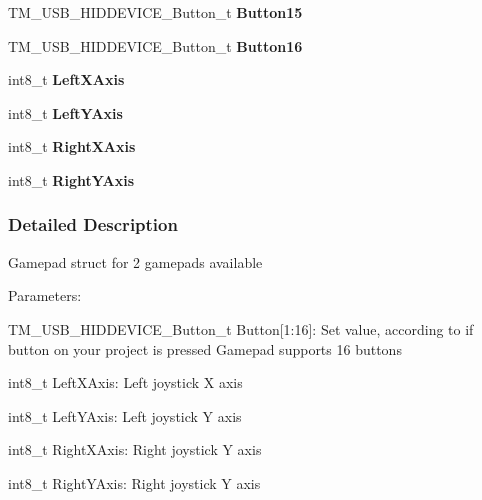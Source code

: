 \begin{DoxyCompactItemize}
\item 
\hypertarget{struct_t_m___u_s_b___h_i_d_d_e_v_i_c_e___gamepad__t_a56b1e8532360426db2b295eb3fdbef41}{}T\+M\+\_\+\+U\+S\+B\+\_\+\+H\+I\+D\+D\+E\+V\+I\+C\+E\+\_\+\+Button\+\_\+t {\bfseries Button15}\label{struct_t_m___u_s_b___h_i_d_d_e_v_i_c_e___gamepad__t_a56b1e8532360426db2b295eb3fdbef41}

\item 
\hypertarget{struct_t_m___u_s_b___h_i_d_d_e_v_i_c_e___gamepad__t_a0280244d78d303ee9c15531118e0e3fe}{}T\+M\+\_\+\+U\+S\+B\+\_\+\+H\+I\+D\+D\+E\+V\+I\+C\+E\+\_\+\+Button\+\_\+t {\bfseries Button16}\label{struct_t_m___u_s_b___h_i_d_d_e_v_i_c_e___gamepad__t_a0280244d78d303ee9c15531118e0e3fe}

\item 
\hypertarget{struct_t_m___u_s_b___h_i_d_d_e_v_i_c_e___gamepad__t_a5056ef0eb78331dcbe32b07d5f98edfd}{}int8\+\_\+t {\bfseries Left\+X\+Axis}\label{struct_t_m___u_s_b___h_i_d_d_e_v_i_c_e___gamepad__t_a5056ef0eb78331dcbe32b07d5f98edfd}

\item 
\hypertarget{struct_t_m___u_s_b___h_i_d_d_e_v_i_c_e___gamepad__t_ad21d8cc1f96897a06d62130fe3769700}{}int8\+\_\+t {\bfseries Left\+Y\+Axis}\label{struct_t_m___u_s_b___h_i_d_d_e_v_i_c_e___gamepad__t_ad21d8cc1f96897a06d62130fe3769700}

\item 
\hypertarget{struct_t_m___u_s_b___h_i_d_d_e_v_i_c_e___gamepad__t_a40a1e0545cdc7dfa2187a4effff832d9}{}int8\+\_\+t {\bfseries Right\+X\+Axis}\label{struct_t_m___u_s_b___h_i_d_d_e_v_i_c_e___gamepad__t_a40a1e0545cdc7dfa2187a4effff832d9}

\item 
\hypertarget{struct_t_m___u_s_b___h_i_d_d_e_v_i_c_e___gamepad__t_a453fa2fa73a73ddc9a633f4fa6dffb63}{}int8\+\_\+t {\bfseries Right\+Y\+Axis}\label{struct_t_m___u_s_b___h_i_d_d_e_v_i_c_e___gamepad__t_a453fa2fa73a73ddc9a633f4fa6dffb63}

\end{DoxyCompactItemize}


\subsubsection{Detailed Description}
Gamepad struct for 2 gamepads available

Parameters\+:
\begin{DoxyItemize}
\item T\+M\+\_\+\+U\+S\+B\+\_\+\+H\+I\+D\+D\+E\+V\+I\+C\+E\+\_\+\+Button\+\_\+t Button\mbox{[}1\+:16\mbox{]}\+: Set value, according to if button on your project is pressed Gamepad supports 16 buttons
\item int8\+\_\+t Left\+X\+Axis\+: Left joystick X axis
\item int8\+\_\+t Left\+Y\+Axis\+: Left joystick Y axis
\item int8\+\_\+t Right\+X\+Axis\+: Right joystick Y axis
\item int8\+\_\+t Right\+Y\+Axis\+: Right joystick Y axis 
\end{DoxyItemize}